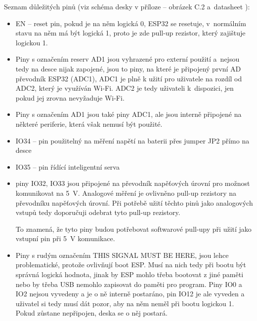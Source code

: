 \documentclass{template/socthesis}
\begin{document}
	
	Seznam důležitých pinů (viz schéma desky v příloze %
	-- obrázek C.2 a~datasheet \cite{DevKitC}): 
	\begin{itemize} 
	\item EN – reset pin, pokud je na něm logická 0, ESP32 se resetuje, v~normálním stavu na něm má být logická 1, proto je zde pull-up rezistor, který zajištuje logickou 1.
	
	\item Piny s označením reserv AD1 jsou vyhrazené pro externí použití 
	a~nejsou tedy na desce nijak zapojené, jsou to piny, na které je připojený 
	první AD převodník ESP32 (ADC1), ADC1 je plně k užití pro uživatele na rozdíl 
	od ADC2, který je využíván Wi-Fi. ADC2 je tedy uživateli k~dispozici, jen pokud jej zrovna nevyžaduje Wi-Fi.
	
	\item Piny s označením AD1 jsou také piny ADC1, ale jsou interně připojené na některé periferie, která však nemusí být použité.
	
	\item IO34 -- pin použitelný na měření napětí na baterii přes jumper JP2 přímo na desce
	\item IO35 -- pin řídící inteligentní serva
	
	\item piny IO32, IO33 jsou připojené na převodník napěťových úrovní pro možnost komunikovat na 5~V. Analogové měření je ovlivněno pull-up rezistory na převodníku napěťových úrovní. Při potřebě užití těchto pinů jako analogových vstupů tedy doporučuji odebrat tyto pull-up rezistory. 
	
	To znamená, že tyto piny budou potřebovat softwarové pull-upy při užití jako vstupní pin při 5~V komunikace.
	
	\item Piny s rudým označením THIS SIGNAL MUST BE HERE, jsou lehce problematické, protože ovlivňují boot ESP. Musí na nich tedy při bootu být správná logická hodnota, jinak by ESP mohlo třeba bootovat z jiné paměti nebo by třeba USB nemohlo zapisovat do paměti pro program. Piny IO0 a IO2 nejsou vyvedeny a je o ně interně postaráno, pin IO12 je ale vyveden a uživatel si tedy musí dát pozor, aby na něm neměl při bootu logickou 1. Pokud zůstane nepřipojen, deska se o něj postará.
	

\end{itemize}
\end{document}
